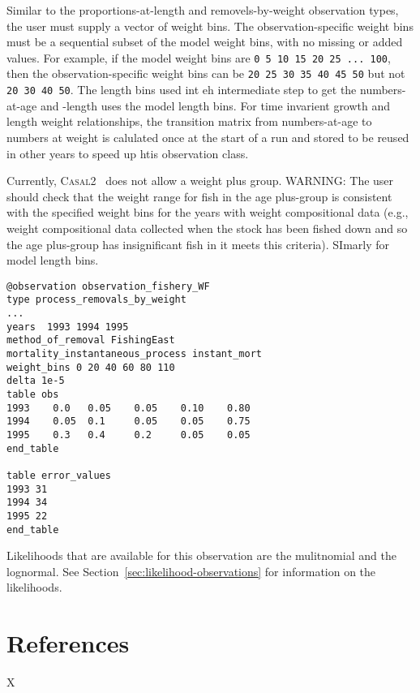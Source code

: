 \documentclass[a4paper,11pt,twoside,pdftex,draft]{article}
\newcommand{\CNAME}{\textsc{Casal2}}
\begin{document}
Similar to the proportions-at-length and removels-by-weight observation types, the user must supply a vector of weight bins. The observation-specific weight bins must be a sequential subset of the model weight bins, with no missing or added values. For example, if the model weight bins are \texttt{0 5 10 15 20 25 ... 100}, then the observation-specific weight bins can be \texttt{20 25 30 35 40 45 50} but not \texttt{20 30 40 50}. The length bins used int eh intermediate step to get the numbers-at-age and -length uses the model length bins. For time invarient growth and length weight relationships, the transition matrix from numbers-at-age to numbers at weight is calulated once at the start of a run and stored to be reused in other years to speed up htis observation class.

Currently, \CNAME~ does not allow a weight plus group. WARNING: The user should check that the weight range for fish in the age plus-group is consistent with the specified weight bins for the years with weight compositional data (e.g., weight compositional data collected when the stock has been fished down and so the age plus-group has insignificant fish in it meets this criteria). SImarly for model length bins.

{\small{\begin{verbatim}
@observation observation_fishery_WF
type process_removals_by_weight
...
years  1993 1994 1995
method_of_removal FishingEast
mortality_instantaneous_process instant_mort
weight_bins 0 20 40 60 80 110
delta 1e-5
table obs
1993    0.0   0.05    0.05    0.10    0.80
1994    0.05  0.1     0.05    0.05    0.75
1995    0.3   0.4     0.2     0.05    0.05
end_table

table error_values
1993 31
1994 34
1995 22
end_table
\end{verbatim}}}

Likelihoods that are available for this observation are the mulitnomial and the lognormal. See Section~\ref{sec:likelihood-observations} for information on the  likelihoods.

\section{References}

X
\end{document}
